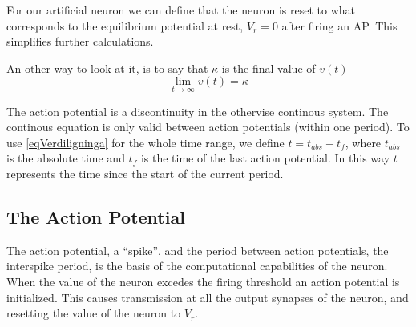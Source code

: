 For our artificial neuron we can define 
that the neuron is reset to what corresponds to the equilibrium potential at rest, $V_r = 0$ after firing an AP.
This simplifies further calculations.

An other way to look at it, is to say that $\kappa$ is the final value of $v(t)$
\begin{equation}
	\lim_{t\to\infty} v(t) = \kappa
	\label{eqKappaSomFinalValueAvV}
\end{equation}

The action potential is a discontinuity in the othervise continous system. The continous equation is only valid between action potentials (within one period).
To use \eqref{eqVerdiligninga} for the whole time range, we define $t = t_{abs}-t_f$, where $t_{abs}$ is the absolute time and $t_f$ is the time of the last action potential. 
In this way $t$ represents the time since the start of the current period.




\subsection{The Action Potential}
The action potential, a ``spike'', and the period between action potentials, the interspike period, is the basis of the computational capabilities of the neuron.
When the value of the neuron excedes the firing threshold an action potential is initialized.
This causes transmission at all the output synapses of the neuron, and resetting the value of the neuron to $V_r$. %

